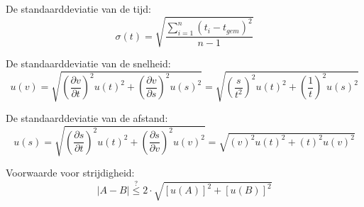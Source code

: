 \documentclass{report}
\begin{document}
\noindent
De standaarddeviatie van de tijd: \cite{epo1-onzekerheden}
\begin{equation}
\label{eq:standaardDev}
	\sigma(t) = \sqrt{\frac{\sum_{i=1}^{n}( t_i-t_{gem})^2}{n-1}}
\end{equation}

\noindent
De standaarddeviatie van de snelheid: \cite{epo1-onzekerheden}
\begin{equation}
\label{eq:velError}
	u(v) = \sqrt{\left (\frac{\partial v }{\partial t }\right)^2 u(t)^2 + \left (\frac{\partial v }{\partial s }\right)^2 u(s)^2} = \sqrt{\left (\frac{s }{{t}^2 }\right)^2 u(t)^2 + \left (\frac{1}{t}\right)^2 u(s)^2}
\end{equation}

\noindent
De standaarddeviatie van de afstand: \cite{epo1-onzekerheden}
\begin{equation}
\label{eq:distError}
	u(s) = \sqrt{\left (\frac{\partial s }{\partial t }\right)^2 u(t)^2 + \left (\frac{\partial s }{\partial v }\right)^2 u(v)^2} = \sqrt{(v)^2 u(t)^2 + (t)^2 u(v)^2} 
\end{equation}

\noindent
Voorwaarde voor strijdigheid: \cite{epo1-onzekerheden}
\begin{equation}
\label{eq:strijdigheid}
	|A-B|\overset{?}{\le}2\cdot\sqrt{[u(A)]^2+[u(B)]^2}
\end{equation}
\end{document}

